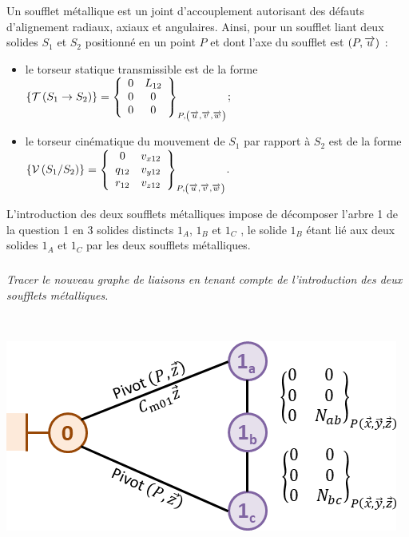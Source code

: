 \documentclass[10pt,fleqn]{article} %
\begin{document}
\begin{multicols}{2}
Un soufflet métallique est un joint d’accouplement autorisant des défauts d’alignement radiaux, axiaux et angulaires. Ainsi, pour un soufflet liant deux solides $S_1$ et $S_2$ positionné en un point $P$ et dont l’axe du soufflet est $\axe{P}{u}$ :
\begin{itemize}
\item le torseur statique transmissible est de la forme $\torseurstat{T}{S_1}{S_2}=\torseurcol{0}{0}{0}{L_{12}}{0}{0}{P,\base{u}{v}{w}}$;
\item le torseur cinématique du mouvement de $S_1$ par rapport à $S_2$ est de la forme $\torseurcin{V}{S_1}{S_2}=\torseurcol{0}{q_{12}}{r_{12}}{v_{x12}}{v_{y12}}{v_{z12}}{P,\base{u}{v}{w}}$.
\end{itemize}


L’introduction des deux soufflets métalliques impose de décomposer l’arbre 1 de la question 1 en 3 solides distincts $1_A$, $1_B$ et $1_C$ , le solide $1_B$ étant lié aux deux solides $1_A$ et $1_C$ par les deux soufflets métalliques.



\subparagraph{}\textit{Tracer le nouveau graphe de liaisons en tenant compte de l’introduction des deux soufflets métalliques.}
\ifprof
\begin{corrige} ~\\

\begin{center}
\includegraphics[width=\linewidth]{images/cor_02}
\end{center}

\end{corrige}
\else
\fi



\end{multicols}
\end{document}
